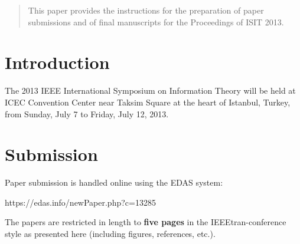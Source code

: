 \documentclass[conference,a4paper]{IEEEtran}
\begin{document}




\maketitle

\begin{abstract}
  This paper provides the instructions for the preparation of paper
  submissions and of final manuscripts for the Proceedings of ISIT
  2013.
\end{abstract}



\section{Introduction}

The 2013 IEEE International Symposium on Information Theory will be
held at ICEC Convention Center near Taksim Square at the heart of
Istanbul, Turkey, from Sunday, July 7 to Friday, July 12, 2013.


\section{Submission}

Paper submission is handled online using the EDAS system:
\begin{center}
  https://edas.info/newPaper.php?c=13285
\end{center}
The papers are restricted in length to \textbf{five pages} in the
IEEEtran-conference style as presented here (including figures,
references, etc.).
\end{document}
